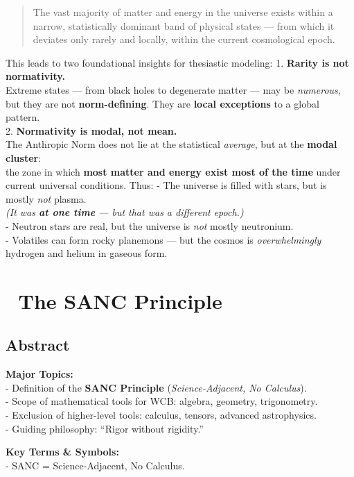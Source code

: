 \documentclass[
  letterpaper,
]{book}
\begin{document}
\begin{quote}
The vast majority of matter and energy in the universe exists within a
narrow, statistically dominant band of physical states --- from which it
deviates only rarely and locally, within the current cosmological epoch.
\end{quote}

This leads to two foundational insights for thesiastic modeling: 1.
\textbf{Rarity is not normativity.}\\
Extreme states --- from black holes to degenerate matter --- may be
\emph{numerous}, but they are not \textbf{norm-defining}. They are
\textbf{local exceptions} to a global pattern.\\
2. \textbf{Normativity is modal, not mean.}\\
The Anthropic Norm does not lie at the statistical \emph{average}, but
at the \textbf{modal cluster}:\\
the zone in which \textbf{most matter and energy exist most of the time}
under current universal conditions. Thus: - The universe is filled with
stars, but is mostly \emph{not} plasma.\\
\emph{(It was \textbf{at one time} --- but that was a different
epoch.)}\\
- Neutron stars are real, but the universe is \emph{not} mostly
neutronium.\\
- Volatiles can form rocky planemons --- but the cosmos is
\emph{overwhelmingly} hydrogen and helium in gaseous form.

\chapter{🔑 The SANC Principle}\label{the-sanc-principle}

\section{Abstract}\label{abstract-1}

\textbf{Major Topics:}\\
- Definition of the \textbf{SANC Principle} (\emph{Science-Adjacent, No
Calculus}).\\
- Scope of mathematical tools for WCB: algebra, geometry,
trigonometry.\\
- Exclusion of higher-level tools: calculus, tensors, advanced
astrophysics.\\
- Guiding philosophy: ``Rigor without rigidity.''

\textbf{Key Terms \& Symbols:}\\
- SANC = Science-Adjacent, No Calculus.
\end{document}
